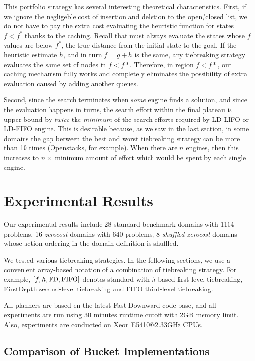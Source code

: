 This portfolio strategy has several interesting theoretical characteristics. First, if we ignore the negligeble cost of insertion and deletion to the open/closed list, we do not have to pay the extra cost evaluating the heuristic function for states $f<f^*$ thanks to the caching.
Recall that \astar must always evaluate the states whose $f$ values are below $f^*$, the true distance from the initial state to the goal. If the heuristic estimate $h$, and in turn $f=g+h$ is the same, any tiebreaking strategy evaluates the same set of nodes in $f<f*$.
Therefore, in region $f<f*$, our caching mechanism fully works and completely eliminates the possibility of extra evaluation caused by adding another queues.

Second, since the search terminates when \emph{some} engine finds a solution, and since the evaluation happens in turns, the search effort within the final plateau is upper-bound by \emph{twice} the \emph{minimum} of the search efforts required by LD-LIFO or LD-FIFO engine. This is desirable because, as we saw in the last section, in some domains the gap between the best and worst tiebreaking strategy can be more than 10 times (Openstacks, for example).
When there are $n$ engines, then this increases to $n\times$ minimum
amount of effort which would be spent by each single engine.

\section{Experimental Results}

Our experimental results include 28 standard benchmark domains with
1104 problems, 16 \emph{zerocost} domains with 640 problems, 8 \emph{shuffled-zerocost} 
domains whose action ordering in the domain definition is shuffled.

We tested various tiebreaking strategies. In the following sections, we
use a convenient array-based notation of a combination of tiebreaking
strategy.  For example, $[f,h,\mbox{FD},\mbox{FIFO}]$ denotes standard \astar with
$h$-based first-level tiebreaking, FirstDepth second-level tiebreaking and FIFO
third-level tiebreaking.

All planners are based on the latest Fast Downward code base, and all
experiments are run using 30 minutes runtime cutoff with 2GB memory
limit. Also, experiments are conducted on Xeon E5410@2.33GHz CPUs.

\subsection{Comparison of Bucket Implementations}

